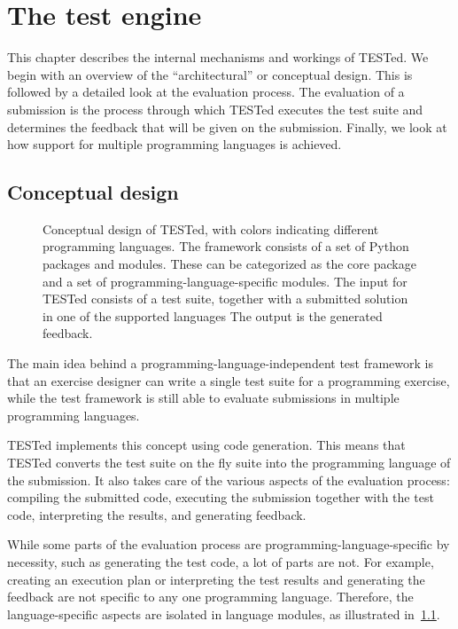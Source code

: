 \documentclass[../main]{subfiles}
\begin{document}
\chapter{The \tested{} test engine}
\label{ch:tested-deel-1-tijdelijke-titel}

This chapter describes the internal mechanisms and workings of TESTed.
We begin with an overview of the ``architectural'' or conceptual design.
This is followed by a detailed look at the evaluation process.
The evaluation of a submission is the process through which TESTed executes the test suite and determines the feedback that will be given on the submission.
Finally, we look at how support for multiple programming languages is achieved.

\section{Conceptual design}
\label{sec:conceptual design}

\begin{figure}[t]
    \centering
    
    \caption{
        Conceptual design of TESTed, with colors indicating different programming languages.
        The framework consists of a set of Python packages and modules.
        These can be categorized as the core package and a set of programming-language-specific modules.
        The input for TESTed consists of a test suite, together with a submitted solution in one of the supported languages
        The output is the generated feedback.
    }
    \label{fig:conceptual-design}
\end{figure}

The main idea behind a programming-language-independent test framework is that an exercise designer can write a single test suite for a programming exercise, while the test framework is still able to evaluate submissions in multiple programming languages.

TESTed implements this concept using code generation.
This means that TESTed converts the test suite on the fly suite into the programming language of the submission.
It also takes care of the various aspects of the evaluation process: compiling the submitted code, executing the submission together with the test code, interpreting the results, and generating feedback.

While some parts of the evaluation process are programming-language-specific by necessity, such as generating the test code, a lot of parts are not.
For example, creating an execution plan or interpreting the test results and generating the feedback are not specific to any one programming language.
Therefore, the language-specific aspects are isolated in language modules, as illustrated in~\cref{fig:conceptual-design}.
\end{document}
